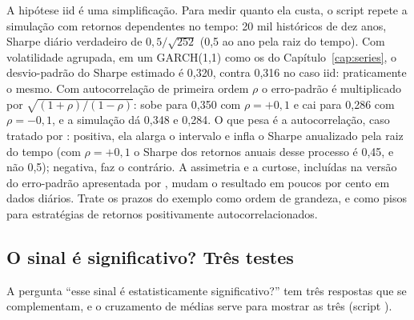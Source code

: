 A hipótese iid é uma simplificação. Para medir quanto ela custa, o script  repete a simulação com retornos dependentes no tempo: 20 mil históricos de dez anos, Sharpe diário verdadeiro de $0,5/\sqrt{252}$ (0,5 ao ano pela raiz do tempo). Com volatilidade agrupada, em um GARCH(1,1) como os do Capítulo~\ref{cap:series}, o desvio-padrão do Sharpe estimado é 0,320, contra 0,316 no caso iid: praticamente o mesmo. Com autocorrelação de primeira ordem $\rho$ o erro-padrão é multiplicado por $\sqrt{(1+\rho)/(1-\rho)}$: sobe para 0,350 com $\rho = +0,1$ e cai para 0,286 com $\rho = -0,1$, e a simulação dá 0,348 e 0,284. O que pesa é a autocorrelação, caso tratado por \citet{lo2002}: positiva, ela alarga o intervalo e infla o Sharpe anualizado pela raiz do tempo (com $\rho = +0,1$ o Sharpe dos retornos anuais desse processo é 0,45, e não 0,5); negativa, faz o contrário. A assimetria e a curtose, incluídas na versão do erro-padrão apresentada por \citet{bailey2012}, mudam o resultado em poucos por cento em dados diários. Trate os prazos do exemplo como ordem de grandeza, e como pisos para estratégias de retornos positivamente autocorrelacionados.

\subsection{O sinal é significativo? Três testes}
\label{sec:c10-significancia}

A pergunta ``esse sinal é estatisticamente significativo?'' tem três respostas que se complementam, e o cruzamento de médias serve para mostrar as três (script ).

